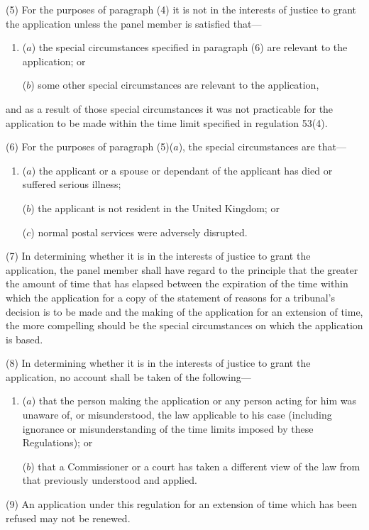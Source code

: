 \documentclass[12pt,a4paper]{article}
\begin{document}
(5) For the purposes of paragraph (4) it is not in the interests of justice to grant the application unless the panel member is satisfied that—
\begin{enumerate}\item[]
($a$) the special circumstances specified in paragraph (6) are relevant to the application; or

($b$) some other special circumstances are relevant to the application,
\end{enumerate}
and as a result of those special circumstances it was not practicable for the application to be made within the time limit specified in regulation 53(4).

(6) For the purposes of paragraph (5)($a$), the special circumstances are that—
\begin{enumerate}\item[]
($a$) the applicant or a spouse or dependant of the applicant has died or suffered serious illness;

($b$) the applicant is not resident in the United Kingdom; or

($c$) normal postal services were adversely disrupted.
\end{enumerate}

(7) In determining whether it is in the interests of justice to grant the application, the panel member shall have regard to the principle that the greater the amount of time that has elapsed between the expiration of the time within which the application for a copy of the statement of reasons for a tribunal’s decision is to be made and the making of the application for an extension of time, the more compelling should be the special circumstances on which the application is based.

(8) In determining whether it is in the interests of justice to grant the application, no account shall be taken of the following—
\begin{enumerate}\item[]
($a$) that the person making the application or any person acting for him was unaware of, or misunderstood, the law applicable to his case (including ignorance or misunderstanding of the time limits imposed by these Regulations); or

($b$) that a Commissioner or a court has taken a different view of the law from that previously understood and applied.
\end{enumerate}

(9) An application under this regulation for an extension of time which has been refused may not be renewed.
\end{document}
